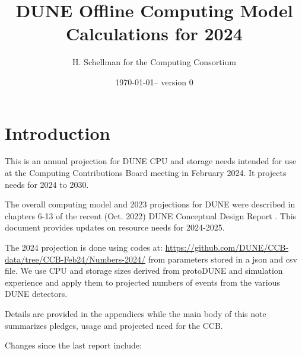 \documentclass[12pt]{article}
\title{DUNE Offline Computing Model Calculations for 2024}
\author{H. Schellman for the Computing Consortium}
\date{\today -- version 0}
\begin{document}
\makeatletter
{}
\makeatother
\newcommand{\csvautotabularright}[2][]{\csvloop{autotabularright={#2},#1}}

\maketitle



\section{Introduction}

This is an annual projection for DUNE CPU and storage needs intended for use at the Computing Contributions Board meeting in February 2024. It projects needs for 2024 to 2030. 

The overall computing model  and 2023 projections for DUNE were described in chapters 6-13 of the recent (Oct. 2022) DUNE Conceptual Design Report \cite{DUNE:2022fcw}.   This document provides updates on resource needs for 2024-2025. 

The 2024 projection is done using codes at: \href{https://github.com/DUNE/CCB-data/tree/CCB-Feb24/Numbers-2024/}{https://github.com/DUNE/CCB-data/tree/CCB-Feb24/Numbers-2024/} from parameters stored in a json and csv file. We use CPU and storage sizes derived from protoDUNE and simulation experience and apply them to projected numbers of events from the various DUNE detectors. 

Details are provided in the appendices while the main body of this note summarizes pledges, usage and projected need for the CCB.





Changes since the last report \cite{CCBReport2023} include:
\end{document}
